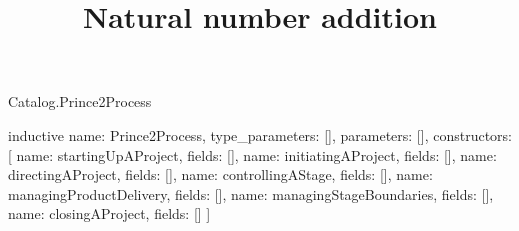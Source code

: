 \begin{lexlean}{Catalog.Prince2Process}
\title{Natural number addition}
\begin{semanticmodule}
inductive{
  name: Prince2Process,
  type_parameters: [],
  parameters: [],
  constructors: [
    {name: startingUpAProject, fields: []},
    {name: initiatingAProject, fields: []},
    {name: directingAProject, fields: []},
    {name: controllingAStage, fields: []},
    {name: managingProductDelivery, fields: []},
    {name: managingStageBoundaries, fields: []},
    {name: closingAProject, fields: []}
  ]
}
\end{semanticmodule}
\end{lexlean}
